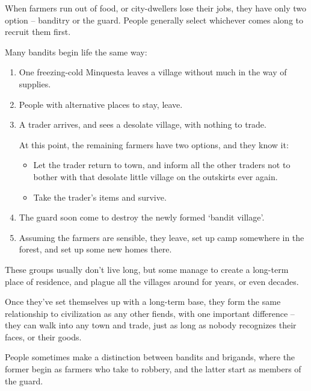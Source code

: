 \begin{multicols}{2}

When farmers run out of food, or city-dwellers lose their jobs, they have only two option -- banditry or the \gls{guard}.
People generally select whichever comes along to recruit them first.

Many bandits begin life the same way:

\begin{enumerate}
  \item
  One freezing-cold \gls{Minquesta} leaves a \gls{village} without much in the way of supplies.
  \item
  People with alternative places to stay, leave.
  \item
  A trader arrives, and sees a desolate \gls{village}, with nothing to trade.

  At this point, the remaining farmers have two options, and they know it:
  \begin{itemize}
    \item
    Let the trader return to town, and inform all the other traders not to bother with that desolate little \gls{village} on the outskirts ever again.
    \item
    Take the trader's items and survive.
  \end{itemize}
  \item
  The \gls{guard} soon come to destroy the newly formed `bandit \gls{village}'.
  \item
  Assuming the farmers are sensible, they leave, set up camp somewhere in the forest, and set up some new homes there.
\end{enumerate}

These groups usually don't live long, but some manage to create a long-term place of residence, and plague all the \glspl{village} around for years, or even decades.

Once they've set themselves up with a long-term base, they form the same relationship to civilization as any other fiends, with one important difference -- they can walk into any town and trade, just as long as nobody recognizes their faces, or their goods.

People sometimes make a distinction between bandits and brigands, where the former begin as farmers who take to robbery, and the latter start as members of the \gls{guard}.




\end{multicols}
